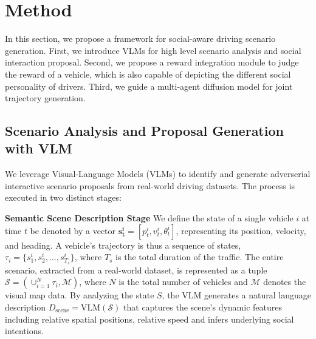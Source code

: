 \section{Method}

% 
In this section, we propose a framework for social-aware driving scenario generation. First, we introduce VLMs for high level scenario analysis and social interaction proposal. Second, we propose a reward integration module to judge the reward of a vehicle, which is also capable of depicting the different social personality of drivers. Third, we guide a multi-agent diffusion model for joint trajectory generation. 


\subsection{Scenario Analysis and Proposal Generation with VLM}

We leverage Visual-Language Models (VLMs) to identify and generate adverserial interactive scenario proposals from real-world driving datasets. The process is executed in two distinct stages:

\textbf{Semantic Scene Description Stage} We define the state of a single vehicle $i$ at time $t$ be denoted by a vector $\mathbf{s_t^i}=[p_t^i,v_t^i,\theta_t^i]$, representing its position, velocity, and heading. A vehicle's trajectory is thus a sequence of states, $\tau_i=\{s_1^i,s_2^i,\dots ,s_{T_s}^i\}$, where $T_s$ is the total duration of the traffic. The entire scenario, extracted from a real-world dataset, is represented as a tuple $\mathcal{S}=(\cup_{i=1}^N \tau_i,\mathcal{M})$, where $N$ is the total number of vehicles and $\mathcal{M}$ denotes the visual map data. By analyzing the state $S$, the VLM generates a natural language description $D_{\text{scene}}= \text{VLM}(\mathcal{S})$ that captures the scene's dynamic features including relative spatial positions, relative speed and infers underlying social intentions. 


